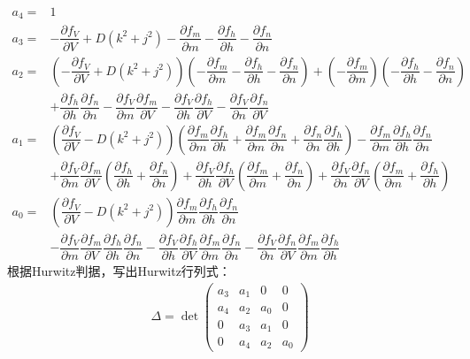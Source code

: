 \documentclass[
    bachelor,
    nofont, %
    pdflinks,
    ]{xjtuthesis}
\begin{document}
\begin{align*}
a_4=&1\\
a_3=& -\dfrac{\partial f_V}{\partial V}+D(k^2+j^2)- \dfrac{\partial f_m}{\partial m}-\dfrac{\partial f_h}{\partial h}-\dfrac{\partial f_n}{\partial n}\\
a_2=&\left(-\dfrac{\partial f_V}{\partial V}+D(k^2+j^2)\right)\left(- \dfrac{\partial f_m}{\partial m}-\dfrac{\partial f_h}{\partial h}-\dfrac{\partial f_n}{\partial n}\right)+\left(- \dfrac{\partial f_m}{\partial m}\right)\left(-\dfrac{\partial f_h}{\partial h}-\dfrac{\partial f_n}{\partial n}\right)\\
& +\dfrac{\partial f_h}{\partial h} \dfrac{\partial f_n}{\partial n} -\dfrac{\partial f_V}{\partial m} \dfrac{\partial f_m}{\partial V} - \dfrac{\partial f_V}{\partial h} \dfrac{\partial f_h}{\partial V} - \dfrac{\partial f_V}{\partial n} \dfrac{\partial f_n}{\partial V} \\
a_1=& \left(\dfrac{\partial f_V}{\partial V}-D(k^2+j^2)\right)\left( \dfrac{\partial f_m}{\partial m}\dfrac{\partial f_h}{\partial h}+\dfrac{\partial f_m}{\partial m}\dfrac{\partial f_n}{\partial n}+\dfrac{\partial f_n}{\partial n}\dfrac{\partial f_h}{\partial h}\right)- \dfrac{\partial f_m}{\partial m}\dfrac{\partial f_h}{\partial h}\dfrac{\partial f_n}{\partial n}\\
&+\dfrac{\partial f_V}{\partial m} \dfrac{\partial f_m}{\partial V}\left(\dfrac{\partial f_h}{\partial h}+\dfrac{\partial f_n}{\partial n}\right)+\dfrac{\partial f_V}{\partial h} \dfrac{\partial f_h}{\partial V}\left(\dfrac{\partial f_m}{\partial m}+\dfrac{\partial f_n}{\partial n}\right)+\dfrac{\partial f_V}{\partial n} \dfrac{\partial f_n}{\partial V}\left( \dfrac{\partial f_m}{\partial m}+\dfrac{\partial f_h}{\partial h}\right)\\
a_0= & \left(\dfrac{\partial f_V}{\partial V}-D(k^2+j^2)\right)\dfrac{\partial f_m}{\partial m}\dfrac{\partial f_h}{\partial h}\dfrac{\partial f_n}{\partial n}\\
& - \dfrac{\partial f_V}{\partial m} \dfrac{\partial f_m}{\partial V}\dfrac{\partial f_h}{\partial h}\dfrac{\partial f_n}{\partial n}-\dfrac{\partial f_V}{\partial h} \dfrac{\partial f_h}{\partial V}\dfrac{\partial f_m}{\partial m}\dfrac{\partial f_n}{\partial n}-\dfrac{\partial f_V}{\partial n} \dfrac{\partial f_n}{\partial V}\dfrac{\partial f_m}{\partial m}\dfrac{\partial f_h}{\partial h}
\end{align*}
根据Hurwitz判据，写出Hurwitz行列式：
\begin{align}
\Delta = \det
\left(
\begin{array}{cccc}
a_3 & a_1 & 0 & 0\\
a_4 & a_2 & a_0 & 0\\
0 & a_3 & a_1 & 0\\
0 & a_4 & a_2 & a_0 
\end{array}
\right)
\end{align}
\end{document}

